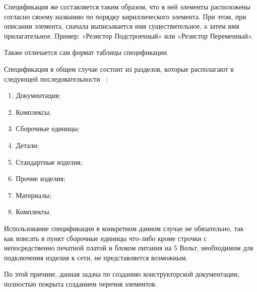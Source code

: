 Спецификация же составляется таким образом,
что в ней элементы расположены согласно своему названию по порядку
кириллического элемента. При этом, при описании элемента,
сначала выписывается имя существительное, а затем имя прилагательное.
Пример: «Резистор Подстроечный» или «Резистор Переменный».

Также отличается сам формат таблицы спецификации.

Спецификация в общем случае состоит из разделов,
которые располагают в следующей последовательности ~\cite{GOST-spec}:
\begin{enumerate}
\item Документация;
\item Комплексы;
\item Сборочные единицы;
\item Детали;
\item Стандартные изделия;
\item Прочие изделия;
\item Материалы;
\item Комплекты.
\end{enumerate}

Использование спецификации в конкретном данном случае не обязательно,
так как вписать в пункт сборочные единицы
что-либо кроме строчки с непосредственно печатной платой
и блоком питания на 5 Вольт,
необходимом для подключения изделия к сети, не представляется возможным.

По этой причине, данная задача по созданию конструкторской документации,
полностью покрыта созданием перечня элементов.

\newpage

